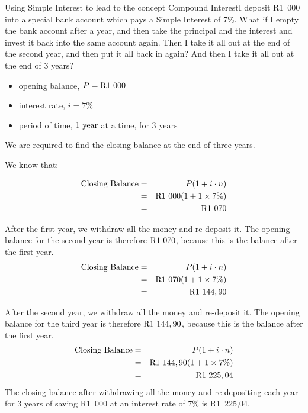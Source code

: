 \documentclass[10pt,a4paper,titlepage,twoside,openright]{report}
\begin{document}
\begin{wex}{Using Simple Interest to lead to the concept Compound Interest}{I deposit R1~000 into a special bank account which pays a Simple Interest of 7\%. What if I empty the bank account after a year, and then take the principal and the interest and invest it back into the same account again. Then I take it all out at the end of the second year, and then put it all back in again? And then I take it all out at the end of 3 years?}{

\begin{itemize}[topsep=0ex, partopsep=\parskip,itemsep=\parskip]
\item{opening balance, $P=\rm{R}1~000$}
\item{interest rate, $i=7\%$}
\item{period of time, $1~\rm{year}$ at a time, for 3 years}
\end{itemize}
We are required to find the closing balance at the end of three years.

We know that:

\begin{eqnarray*}
\mbox{Closing Balance} &=& P (1 + i\cdot n)\\
&=& \rm{R}1~000 (1 + 1\times 7\%)\\
&=& \rm{R}1~070
\end{eqnarray*}

After the first year, we withdraw all the money and re-deposit it. The opening balance for the second year is therefore $\rm{R}1~070$, because this is the balance after the first year.
\begin{eqnarray*}
\mbox{Closing Balance} &=& P (1 + i\cdot n)\\
&=& \rm{R}1~070 (1 + 1\times 7\%)\\
&=& \rm{R}1~144,90
\end{eqnarray*}

After the second year, we withdraw all the money and re-deposit it. The opening balance for the third year is therefore $\rm{R}1~144,90$, because this is the balance after the first year.
\begin{eqnarray*}
\mbox{Closing Balance} &=& P (1 + i\cdot n)\\
&=& \rm{R}1~144,90 (1 + 1\times 7\%)\\
&=& \rm{R}1~225,04
\end{eqnarray*}
The closing balance after withdrawing all the money and re-depositing each year for 3 years of saving R1~000 at an interest rate of 7\% is R1~225,04.}
\end{wex}
\end{document}
